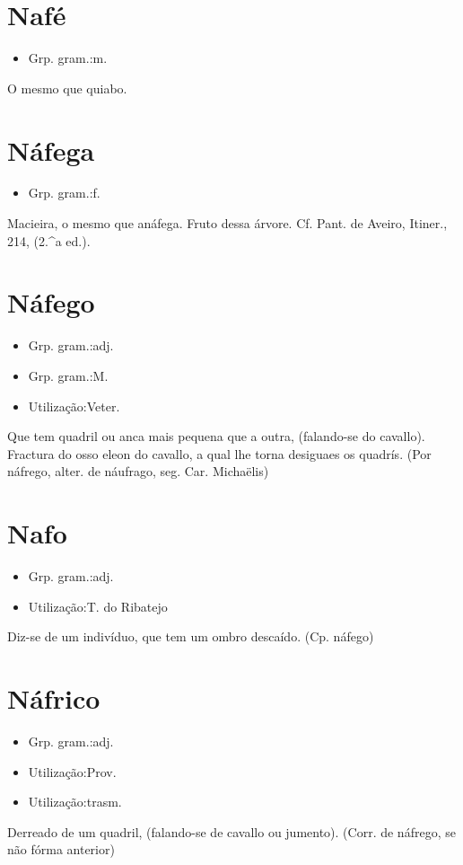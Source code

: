 \section{Nafé}
\begin{itemize}
\item {Grp. gram.:m.}
\end{itemize}
O mesmo que \textunderscore quiabo\textunderscore .
\section{Náfega}
\begin{itemize}
\item {Grp. gram.:f.}
\end{itemize}
Macieira, o mesmo que \textunderscore anáfega\textunderscore .
Fruto dessa árvore. Cf. Pant. de Aveiro, \textunderscore Itiner.\textunderscore , 214, (2.^a ed.).
\section{Náfego}
\begin{itemize}
\item {Grp. gram.:adj.}
\end{itemize}
\begin{itemize}
\item {Grp. gram.:M.}
\end{itemize}
\begin{itemize}
\item {Utilização:Veter.}
\end{itemize}
Que tem quadril ou anca mais pequena que a outra, (falando-se do cavallo).
Fractura do osso eleon do cavallo, a qual lhe torna desiguaes os quadrís.
(Por \textunderscore náfrego\textunderscore , alter. de \textunderscore náufrago\textunderscore , seg. Car. Michaëlis)
\section{Nafo}
\begin{itemize}
\item {Grp. gram.:adj.}
\end{itemize}
\begin{itemize}
\item {Utilização:T. do Ribatejo}
\end{itemize}
Diz-se de um indivíduo, que tem um ombro descaído.
(Cp. \textunderscore náfego\textunderscore )
\section{Náfrico}
\begin{itemize}
\item {Grp. gram.:adj.}
\end{itemize}
\begin{itemize}
\item {Utilização:Prov.}
\end{itemize}
\begin{itemize}
\item {Utilização:trasm.}
\end{itemize}
Derreado de um quadril, (falando-se de cavallo ou jumento).
(Corr. de \textunderscore náfrego\textunderscore , se não fórma anterior)
